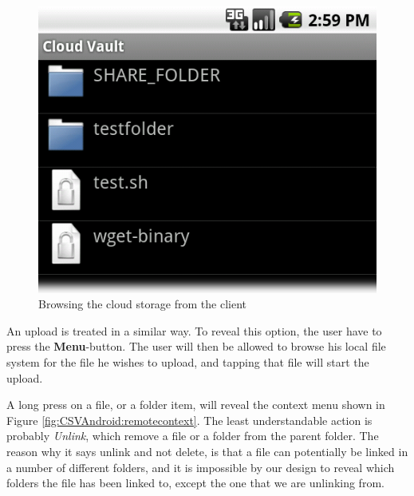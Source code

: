 \documentclass[pdftex,english,10pt,b5paper,twoside]{book}
\begin{document}
\begin{figure}[h!]
    \centering
    \includegraphics[scale=0.4]{client-remotebrowse.png}
    \caption{Browsing the cloud storage from the client}
    \label{fig:CSVAndroid:remotebrowse}
\end{figure}

An upload is treated in a similar way. To reveal this option, the user have to
press the \textbf{Menu}-button. The user will then be allowed to browse his
local file system for the file he wishes to upload, and tapping that file will
start the upload.

A long press on a file, or a folder item, will reveal the context menu shown in
Figure \ref{fig:CSVAndroid:remotecontext}. The least understandable action is
probably \emph{Unlink}, which remove a file or a folder from the parent folder.
The reason why it says unlink and not delete, is that a file can potentially be
linked in a number of different folders, and it is impossible by our design to
reveal which folders the file has been linked to, except the one that we are
unlinking from.
\end{document}
